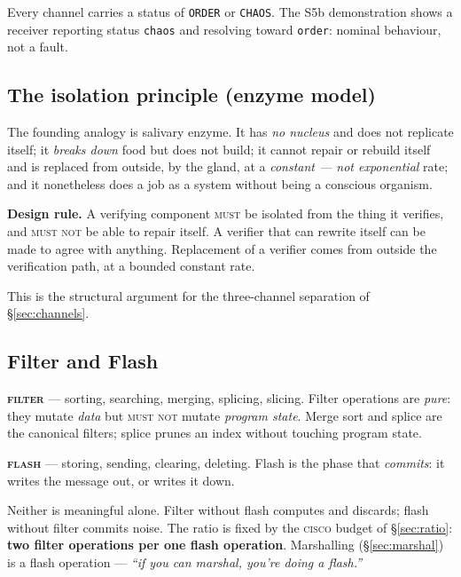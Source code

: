 \documentclass[11pt,a4paper]{article}
\newcommand{\MUST}{\textsc{must}}
\newcommand{\MUSTNOT}{\textsc{must not}}
\newcommand{\CISCO}{\textsc{cisco}}
\begin{document}
Every channel carries a status of \texttt{ORDER} or \texttt{CHAOS}. The S5b
demonstration shows a receiver reporting status \texttt{chaos} and resolving
toward \texttt{order}: nominal behaviour, not a fault.

\subsection{The isolation principle (enzyme model)}
\label{sec:enzyme}

The founding analogy is salivary enzyme. It has \emph{no nucleus} and does not
replicate itself; it \emph{breaks down} food but does not build; it cannot
repair or rebuild itself and is replaced from outside, by the gland, at a
\emph{constant --- not exponential} rate; and it nonetheless does a job as a
system without being a conscious organism.

\begin{ruleblock}
\textbf{Design rule.} A verifying component \MUST{} be isolated from the thing
it verifies, and \MUSTNOT{} be able to repair itself. A verifier that can
rewrite itself can be made to agree with anything. Replacement of a verifier
comes from outside the verification path, at a bounded constant rate.
\end{ruleblock}

This is the structural argument for the three-channel separation of
\S\ref{sec:channels}.

\subsection{Filter and Flash}
\label{sec:filterflash}

\textbf{\textsc{filter}} --- sorting, searching, merging, splicing, slicing.
Filter operations are \emph{pure}: they mutate \emph{data} but \MUSTNOT{}
mutate \emph{program state}. Merge sort and splice are the canonical filters;
splice prunes an index without touching program state.

\textbf{\textsc{flash}} --- storing, sending, clearing, deleting. Flash is the
phase that \emph{commits}: it writes the message out, or writes it down.

Neither is meaningful alone. Filter without flash computes and discards; flash
without filter commits noise. The ratio is fixed by the \CISCO{} budget of
\S\ref{sec:ratio}: \textbf{two filter operations per one flash operation}.
Marshalling (\S\ref{sec:marshal}) is a flash operation --- \emph{``if you can
marshal, you're doing a flash.''}
\end{document}
